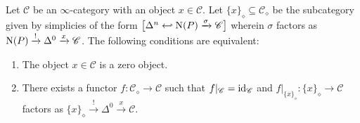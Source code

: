 \documentclass{tac}
\newcommand{\s}[1]{\mathscr{#1}}
\newcommand{\tx}[1]{\textnormal{#1}}
\begin{document}
\begin{proposition}\label{sectiondiamondzeroobj} Let $\s{C}$ be an $\infty$-category with an object $x\in \s{C}$.  Let $\{ x \}_\diamond \subseteq  \s{C}_\diamond$ be the subcategory given by simplicies of the form $\big[ \Delta^n \hookleftarrow \tx{N}(P) \xrightarrow{\sigma} \s{C} \big]$ wherein $\sigma$ factors as $\tx{N}(P) \xrightarrow{!} \Delta^0 \xrightarrow{x} \s{C}$.  The following conditions are equivalent:
\begin{enumerate}
\item\label{sectiondiamondzeroobj1} The object $x\in \s{C}$ is a zero object.
\item\label{sectiondiamondzeroobj2} There exists a functor $f : \s{C}_\diamond \to \s{C}$ such that $f|_{\s{C}} = \tx{id}_{\s{C}}$ and $f|_{\{ x \}_\diamond} : \{ x \}_\diamond \to \s{C}$ factors as $\{ x \}_\diamond \xrightarrow{!} \Delta^0 \xrightarrow{x} \s{C}$.
\end{enumerate}
\end{proposition}
\end{document}
